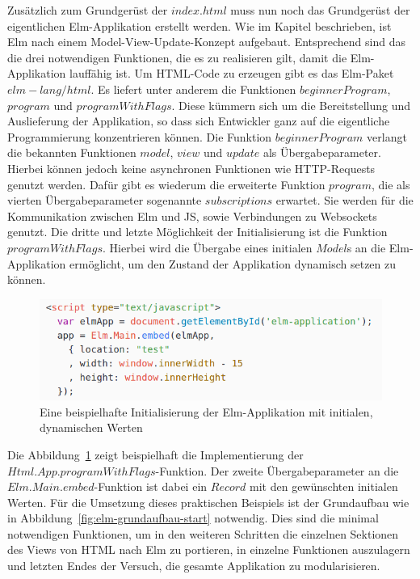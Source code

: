 Zusätzlich zum Grundgerüst der $index.html$ muss nun noch das Grundgerüst der eigentlichen Elm-Applikation erstellt werden. Wie im Kapitel  beschrieben, ist Elm nach einem Model-View-Update-Konzept aufgebaut. Entsprechend sind das die drei notwendigen Funktionen, die es zu realisieren gilt, damit die Elm-Applikation lauffähig ist. Um \ac{HTML}-Code zu erzeugen gibt es das Elm-Paket $elm-lang/html$. Es liefert unter anderem die Funktionen $beginnerProgram$, $program$ und $programWithFlags$. Diese kümmern sich um die Bereitstellung und Auslieferung der Applikation, so dass sich Entwickler ganz auf die eigentliche Programmierung konzentrieren können. Die Funktion $beginnerProgram$ verlangt die bekannten Funktionen $model$, $view$ und $update$ als Übergabeparameter. Hierbei können jedoch keine asynchronen Funktionen wie \ac{HTTP}-Requests genutzt werden.
Dafür gibt es wiederum die erweiterte Funktion $program$, die als vierten Übergabeparameter sogenannte $subscriptions$ erwartet. Sie werden für die Kommunikation zwischen Elm und \ac{JS}, sowie Verbindungen zu Websockets genutzt.
Die dritte und letzte Möglichkeit der Initialisierung ist die Funktion $programWithFlags$. Hierbei wird die Übergabe eines initialen $Model$s an die Elm-Applikation ermöglicht, um den Zustand der Applikation dynamisch setzen zu können.
\begin{figure}[ht]
\centering\includegraphics[scale=0.6]{img/programWithFlags_pass_data.png}
\caption{Eine beispielhafte Initialisierung der Elm-Applikation mit initialen, dynamischen Werten}\label{fig:programWithFlags}
\end{figure}
Die Abbildung~\ref{fig:programWithFlags} zeigt beispielhaft die Implementierung der $Html.App.programWithFlags$-Funktion. Der zweite Übergabeparameter an die $Elm.Main.embed$-Funktion ist dabei ein $Record$ mit den gewünschten initialen Werten.
Für die Umsetzung dieses praktischen Beispiels ist der Grundaufbau wie in Abbildung~\ref{fig:elm-grundaufbau-start} notwendig. Dies sind die minimal notwendigen Funktionen, um in den weiteren Schritten die einzelnen Sektionen des Views von \ac{HTML} nach Elm zu portieren, in einzelne Funktionen auszulagern und letzten Endes der Versuch, die gesamte Applikation zu modularisieren.
